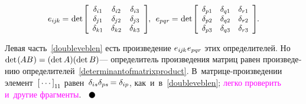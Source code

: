 \begin{otherlanguage}{russian}
\nopagebreak\vspace{-0.25em}\begin{equation*}
e_{i\hspace{-0.1ex}j\hspace{-0.1ex}k} \hspace{-0.1ex} = \hspace{.1ex}
\operatorname{det}\hspace{-0.25ex} \scalebox{0.96}[0.96]{$\left[\begin{array}{ccc}
\delta_{i1} & \delta_{i2} & \delta_{i3} \\
\delta_{\hspace{-0.1ex}j1} & \delta_{\hspace{-0.1ex}j2} & \delta_{\hspace{-0.1ex}j3} \\
\delta_{k1} & \delta_{k2} & \delta_{k3}
\end{array}\right]$} \hspace{-0.25ex}, \:\:
e_{pqr} \hspace{-0.1ex} = \hspace{.1ex}
\operatorname{det}\hspace{-0.25ex} \scalebox{0.96}[0.96]{$\left[\begin{array}{ccc}
\delta_{p1} & \delta_{q1} & \delta_{r1} \\
\delta_{p2} & \delta_{q2} & \delta_{r2} \\
\delta_{p3} & \delta_{q3} & \delta_{r3}
\end{array}\right]$}
\hspace{-0.2ex} .
\end{equation*}

\vspace{-0.1em}\noindent
Левая часть~\eqref{doubleveblen}
есть произведение
${e_{i\hspace{-0.1ex}j\hspace{-0.1ex}k} \hspace{.1ex} e_{pqr}}$
этих определителей.
Но~${\operatorname{det} \hspace{.2ex} (\hspace{-0.1ex}AB\hspace{.1ex}) = (\operatorname{det} A)(\operatorname{det} B)}$\:---
определитель произведения матриц равен произведению определителей~\eqref{determinantofmatrixproduct}.
В~матрице\hbox{-}произведении
элемент~${\left[{\,\cdots\,}\right]}_{1\hspace{-0.1ex}1}$
равен~${\delta_{is} \delta_{ps} \hspace{-0.2ex} = \delta_{ip}}$,
как~и~в~\eqref{doubleveblen};
\textcolor{magenta}{легко проверить и~другие фрагменты}.
${ \hspace{.6em}
\tikz[baseline=-0.6ex] \draw [color=black, fill=black] (0, 0) circle (.8ex); }$

\end{otherlanguage}

